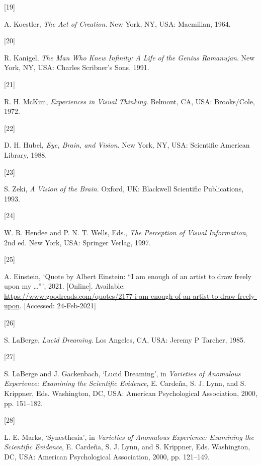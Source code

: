 \documentclass[
  a4paper,
]{article}
\newlength{\cslhangindent}
\newlength{\csllabelwidth}
\newlength{\cslentryspacingunit} %
\newenvironment{CSLReferences}[2] %
 {%
  \setlength{\parindent}{0pt}
  \ifodd #1
  \let\oldpar\par
  \def\par{\hangindent=\cslhangindent\oldpar}
  \fi
  \setlength{\parskip}{#2\cslentryspacingunit}
 }%
 {}
\newcommand{\CSLLeftMargin}[1]{\parbox[t]{\csllabelwidth}{#1}}
\newcommand{\CSLRightInline}[1]{\parbox[t]{\linewidth - \csllabelwidth}{#1}\break}
\begin{document}
\begin{CSLReferences}{0}{0}
\leavevmode{}%
\CSLLeftMargin{{[}19{]} }
\CSLRightInline{A. Koestler, \emph{{The Act of Creation}}. New York, NY,
USA: Macmillan, 1964. }

\leavevmode{}%
\CSLLeftMargin{{[}20{]} }
\CSLRightInline{R. Kanigel, \emph{{The Man Who Knew Infinity: A Life of
the Genius Ramanujan}}. New York, NY, USA: Charles Scribner's Sons,
1991. }

\leavevmode{}%
\CSLLeftMargin{{[}21{]} }
\CSLRightInline{R. H. McKim, \emph{{Experiences in Visual Thinking}}.
Belmont, CA, USA: Brooks/Cole, 1972. }

\leavevmode{}%
\CSLLeftMargin{{[}22{]} }
\CSLRightInline{D. H. Hubel, \emph{{Eye, Brain, and Vision}}. New York,
NY, USA: Scientific American Library, 1988. }

\leavevmode{}%
\CSLLeftMargin{{[}23{]} }
\CSLRightInline{S. Zeki, \emph{{A Vision of the Brain}}. Oxford, UK:
Blackwell Scientific Publications, 1993. }

\leavevmode{}%
\CSLLeftMargin{{[}24{]} }
\CSLRightInline{W. R. Hendee and P. N. T. Wells, Eds., \emph{{The
Perception of Visual Information}}, 2nd ed. New York, USA: Springer
Verlag, 1997. }

\leavevmode{}%
\CSLLeftMargin{{[}25{]} }
\CSLRightInline{A. Einstein, {`{Quote by Albert Einstein: {``I am enough
of an artist to draw freely upon my \ldots{}''}}'}, 2021. {[}Online{]}.
Available:
\url{https://www.goodreads.com/quotes/2177-i-am-enough-of-an-artist-to-draw-freely-upon}.
{[}Accessed: 24-Feb-2021{]}}

\leavevmode{}%
\CSLLeftMargin{{[}26{]} }
\CSLRightInline{S. LaBerge, \emph{{Lucid Dreaming}}. Los Angeles, CA,
USA: Jeremy P Tarcher, 1985. }

\leavevmode{}%
\CSLLeftMargin{{[}27{]} }
\CSLRightInline{S. LaBerge and J. Gackenbach, {`{Lucid Dreaming}'}, in
\emph{{Varieties of Anomalous Experience: Examining the Scientific
Evidence}}, E. Cardeña, S. J. Lynn, and S. Krippner, Eds. Washington,
DC, USA: American Psychological Association, 2000, pp. 151--182. }

\leavevmode{}%
\CSLLeftMargin{{[}28{]} }
\CSLRightInline{L. E. Marks, {`Synesthesia'}, in \emph{{Varieties of
Anomalous Experience: Examining the Scientific Evidence}}, E. Cardeña,
S. J. Lynn, and S. Krippner, Eds. Washington, DC, USA: American
Psychological Association, 2000, pp. 121--149. }


\end{CSLReferences}
\end{document}
